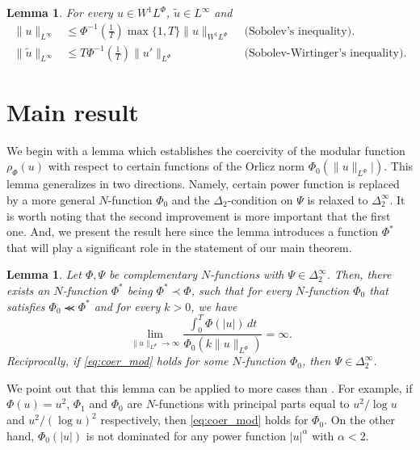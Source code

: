 \documentclass[twoside]{elsarticle}
\newtheorem{lem}[thm]{Lemma}
\theoremstyle{remark}
\newcommand{\orlnor}{\|_{L^{\Phi}}}
\newcommand{\lphi}{L^{\Phi}}
\newcommand{\wphi}{W^{1}\lphi}
\newcommand{\sobnor}{\|_{W^{1}\lphi}}
\renewcommand{\leq}{\leqslant}
\newcounter{example}
\begin{document}
\begin{lem}\label{inclusion orlicz} For every $u\in\wphi$, $\widetilde{u}\in L^{\infty}$ and
\begin{align}
 \|u\|_{L^{\infty}} &\leq\Phi^{-1}\left(\frac{1}{T}\right)\max\{1,T\}\|u\sobnor&\text{  (Sobolev's inequality).}\label{sobolev}\\
 \|\widetilde{u}\|_{L^{\infty}} &\leq T\Phi^{-1}\left(\frac{1}{T}\right)\|u'\orlnor&
\text{  (Sobolev-Wirtinger's inequality).}\label{wirtinger}
\end{align}

\end{lem}


\section{Main result}

We begin with a lemma which establishes the coercivity of the modular function $\rho_{\Phi}(u)$ with respect to certain functions of the Orlicz norm $\Phi_0(\|u\orlnor|)$. This lemma generalizes \cite[Lemma 5.2]{ABGMS2015} in two directions.
Namely, certain power function is replaced by a more general $N$-function $\Phi_0$ and
the $\Delta_2$-condition  on $\Psi$ is relaxed to $\Delta_2^{\infty}$.
It is worth noting that the second improvement is more important that the first one.
And, we present the result here since the lemma introduces a function $\Phi^*$ that will play a significant role in the statement of our main theorem.

\begin{lem}\label{lem_coer}
Let $\Phi,\Psi$ be complementary $N$-functions with $\Psi \in \Delta_2^{\infty}$. Then,
there exists an $N$-function $\Phi^*$ being $\Phi^*\prec\Phi$,
such that  for every $N$-function $\Phi_0$ that satisfies $\Phi_0\llcurly\Phi^*$ and for every $k>0$, we have
\begin{equation}\label{eq:coer_mod}
\lim\limits_{\|u\orlnor\to \infty}
\frac{\int_0^T \Phi(|u|)\,dt}{\Phi_0(k\|u\orlnor)}=\infty.
\end{equation}
Reciprocally, if  \eqref{eq:coer_mod} holds for some $N$-function $\Phi_0$,  then $\Psi\in\Delta_2^{\infty}$.
\end{lem}



 We point out that this lemma can be applied to more cases than \cite[Lemma 5.2]{ABGMS2015}. For example, if $\Phi(u)=u^2$, $\Phi_1$ and $\Phi_0$ are  $N$-functions with principal parts equal to $u^2/\log u$ and $u^2/(\log u)^2$ respectively, then  \eqref{eq:coer_mod} holds for $\Phi_0$. On the other hand, $\Phi_0(|u|)$ is not dominated for any  power function $|u|^{\alpha}$ with $\alpha<2$.
\end{document}
